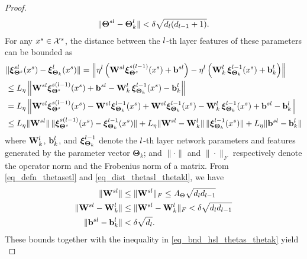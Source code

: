 \documentclass[review,supplement,onefignum,onetabnum]{siamonline250211}
\begin{document}
\begin{proof}
%
\begin{equation}
\label{eq_dist_thetasl_thetakl}
\begin{split}
\| \boldsymbol{\Theta}^{sl} -  \boldsymbol{\Theta}_{k}^{l} \| < \delta  \sqrt{{d_l}({d_{l-1}}+1)}.
\end{split}
\end{equation}
%
For any $x^s \in \mathcal{X}^s$, the distance between the $l$-th layer features of these parameters can be bounded as
%
\begin{equation}
\label{eq_bnd_hsl_thetas_thetak}
\begin{split}
& \| \boldsymbol{\xi}^{sl}_{\boldsymbol{\Theta}^{s}}(x^s) - \boldsymbol{\xi}^{l}_{\boldsymbol{\Theta}_k}(x^s)  \|   
= \left \|  \eta^l \left( \mathbf{W}^{sl} \boldsymbol{\xi}^{s(l-1)}_{\boldsymbol{\Theta}^{s}}(x^s) + \mathbf{b}^{sl} \right) 
- 
\eta^l \left( \mathbf{W}^{l}_k \, \boldsymbol{\xi}^{l-1}_{\boldsymbol{\Theta}_k}(x^s) + \mathbf{b}^{l}_k \right)
 \right \| \\
& \leq
 {L_\eta} \left \| \mathbf{W}^{sl} \boldsymbol{\xi}^{s(l-1)}_{\boldsymbol{\Theta}^{s}}(x^s) + \mathbf{b}^{sl} 
 -
 \mathbf{W}^{l}_k \, \boldsymbol{\xi}^{l-1}_{\boldsymbol{\Theta}_k}(x^s) - \mathbf{b}^{l}_k
   \right \| \\
&  = 
 {L_\eta} \left \| \mathbf{W}^{sl} \boldsymbol{\xi}^{s(l-1)}_{\boldsymbol{\Theta}^{s}}(x^s) 
 - \mathbf{W}^{sl}  \boldsymbol{\xi}^{l-1}_{\boldsymbol{\Theta}_k}(x^s)
 + \mathbf{W}^{sl}  \boldsymbol{\xi}^{l-1}_{\boldsymbol{\Theta}_k}(x^s)
 -  \mathbf{W}^{l}_k \, \boldsymbol{\xi}^{l-1}_{\boldsymbol{\Theta}_k}(x^s)  
 + \mathbf{b}^{sl} - \mathbf{b}^{l}_k
   \right \| \\
  & \leq
 {L_\eta} 
 \|  \mathbf{W}^{sl} \|  \,  \|   \boldsymbol{\xi}^{s(l-1)}_{\boldsymbol{\Theta}^{s}}(x^s)  - \boldsymbol{\xi}^{l-1}_{\boldsymbol{\Theta}_k}(x^s)  \|
 +{L_\eta}
 \|  \mathbf{W}^{sl}  - \mathbf{W}^{l}_k \| \, \| \boldsymbol{\xi}^{l-1}_{\boldsymbol{\Theta}_k}(x^s) \|
 +{L_\eta}
 \| \mathbf{b}^{sl} - \mathbf{b}^{l}_k \|
\end{split}
\end{equation}
%
where $\mathbf{W}^{l}_k$, $\mathbf{b}^{l}_k$, and $\boldsymbol{\xi}^{l-1}_{ \boldsymbol{\Theta}_k }$ denote the $l$-th layer network parameters and features generated by the parameter vector  $\boldsymbol{\Theta}_{k}$; and $\|  \cdot \|$ and $\| \cdot \|_F$ respectively denote the operator norm and the Frobenius norm of a matrix. From \eqref{eq_defn_thetasetl} and \eqref{eq_dist_thetasl_thetakl}, we have 
%
\begin{equation*}
\begin{split}
\| \mathbf{W}^{sl} \| & \leq \| \mathbf{W}^{sl} \|_F \leq {A_\Theta} \sqrt{{d_l} {d_{l-1}}} \\
 \|  \mathbf{W}^{sl}  - \mathbf{W}^{l}_k \| 
 & \leq  \|  \mathbf{W}^{sl}  - \mathbf{W}^{l}_k \|_F    <  \delta \sqrt{{d_l} {d_{l-1}}} \\
 \|  \mathbf{b}^{sl} - \mathbf{b}^{l}_k  \| 
 & <   \delta \sqrt{{d_l}}.
\end{split}
\end{equation*}
%
These bounds together with the inequality in \eqref{eq_bnd_hsl_thetas_thetak} yield
%
\begin{equation}

\end{equation}
\end{proof}
\end{document}
